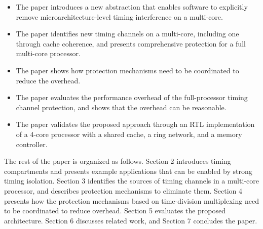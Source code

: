 \begin{itemize}
\item The paper introduces a new abstraction that enables software to
explicitly remove microarchitecture-level timing interference on a multi-core.
\item The paper identifies new timing channels on a multi-core,
including one through cache coherence, and presents
comprehensive protection for a full multi-core processor.
\item The paper shows how protection mechanisms need to be coordinated to
reduce the overhead.%
\item The paper evaluates the performance overhead of the full-processor
timing channel protection, and shows that the overhead can be reasonable.
\item The paper validates the proposed approach through an RTL implementation of 
a 4-core processor with a shared cache, a ring network, and a memory controller.
\end{itemize}

The rest of the paper is organized as follows.
Section 2 introduces timing compartments and 
presents example applications that can be enabled by strong timing isolation.
Section 3 identifies the sources of timing channels in a multi-core processor, and
describes protection mechanisms to eliminate them. 
Section 4 presents how the protection mechanisms based on time-division
multiplexing need to be coordinated to reduce overhead.
Section 5 evaluates the proposed architecture. Section 6 discusses related
work, and Section 7 concludes the paper.
